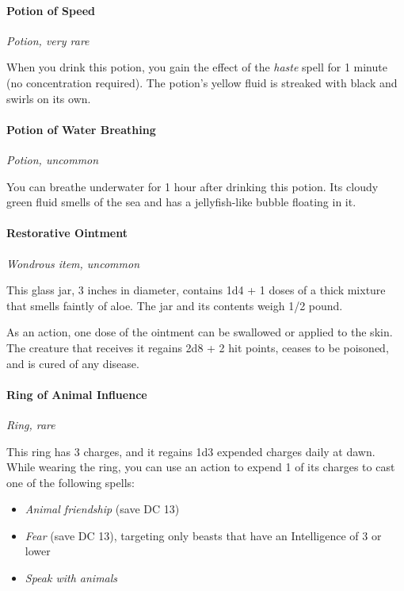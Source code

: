 \documentclass[
]{article}
\providecommand{\tightlist}{%
  \setlength{\itemsep}{0pt}\setlength{\parskip}{0pt}}
\begin{document}
\hypertarget{potion-of-speed}{%
\paragraph{Potion of Speed}\label{potion-of-speed}}

\emph{Potion, very rare}

When you drink this potion, you gain the effect of the \emph{haste}
spell for 1 minute (no concentration required). The potion's yellow
fluid is streaked with black and swirls on its own.

\hypertarget{potion-of-water-breathing}{%
\paragraph{Potion of Water Breathing}\label{potion-of-water-breathing}}

\emph{Potion, uncommon}

You can breathe underwater for 1 hour after drinking this potion. Its
cloudy green fluid smells of the sea and has a jellyfish-like bubble
floating in it.

\hypertarget{restorative-ointment}{%
\paragraph{Restorative Ointment}\label{restorative-ointment}}

\emph{Wondrous item, uncommon}

This glass jar, 3 inches in diameter, contains 1d4 + 1 doses of a thick
mixture that smells faintly of aloe. The jar and its contents weigh 1/2
pound.

As an action, one dose of the ointment can be swallowed or applied to
the skin. The creature that receives it regains 2d8 + 2 hit points,
ceases to be poisoned, and is cured of any disease.

\hypertarget{ring-of-animal-influence}{%
\paragraph{Ring of Animal Influence}\label{ring-of-animal-influence}}

\emph{Ring, rare}

This ring has 3 charges, and it regains 1d3 expended charges daily at
dawn. While wearing the ring, you can use an action to expend 1 of its
charges to cast one of the following spells:

\begin{itemize}
\tightlist
\item
  \emph{Animal friendship} (save DC 13)
\item
  \emph{Fear} (save DC 13), targeting only beasts that have an
  Intelligence of 3 or lower
\item
  \emph{Speak with animals}
\end{itemize}
\end{document}
